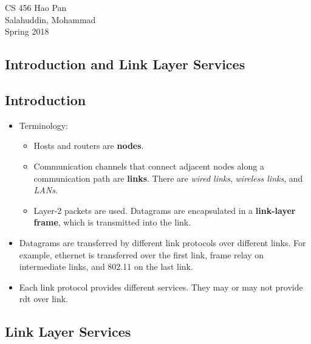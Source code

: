 \documentclass{article}
\begin{document}
\noindent
{CS 456 \hfill Hao Pan}\\
{Salahuddin, Mohammad}\\
{Spring 2018}


\begin{center}
\section{Introduction and Link Layer Services}
\noindent
\end{center}

\subsection{Introduction}

\begin{itemize}
\item Terminology:
\begin{itemize}
\item Hosts and routers are {\bf nodes}.
\item Communication channels that connect adjacent nodes along a communication path are {\bf links}. There are \emph{wired links}, \emph{wireless links}, and \emph{LANs}.
\item Layer-2 packets are used. Datagrams are encapsulated in a {\bf link-layer frame}, which is transmitted into the link.
\end{itemize}
\item Datagrams are transferred by different link protocols over different links. For example, ethernet is transferred over the first link, frame relay on intermediate links, and 802.11 on the last link.
\item Each link protocol provides different services. They may or may not provide rdt over link.
\end{itemize}

\subsection{Link Layer Services}
\end{document}
